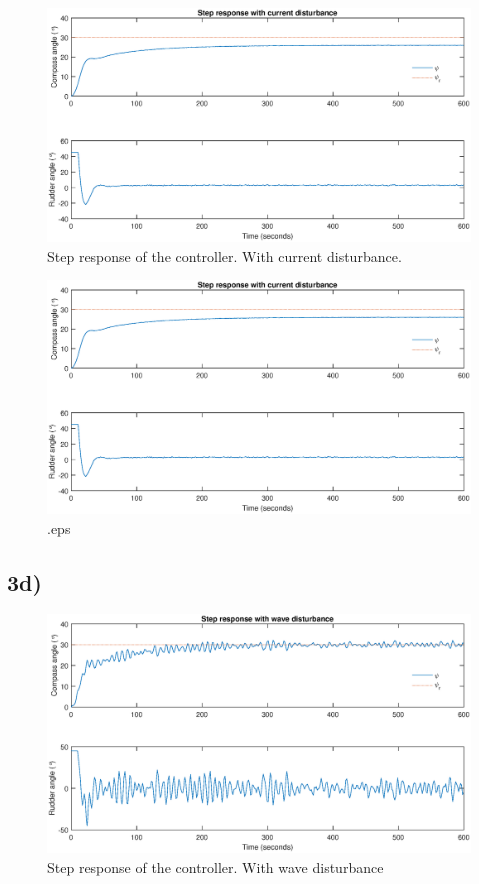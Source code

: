 \begin{figure}
    \centering
    \includegraphics[width=\textwidth]{images/oppg3/stepresp_current_disturbance.eps}
    \caption{Step response of the controller. With current disturbance.}
    \label{fig:step_current_dist}
\end{figure}

\begin{figure}
    \includegraphics[width=\textwidth]{images/oppg3/stepresp_current_disturbance.eps}
    \caption{.eps}
    \label{}
\end{figure}

\subsection{3d)}


\begin{figure}
    \centering
    \includegraphics[width=\textwidth]{images/oppg3/stepresp_wave_disturbance.eps}
    \caption{Step response of the controller. With wave disturbance}
    \label{fig:step_wave_dist}
\end{figure}

